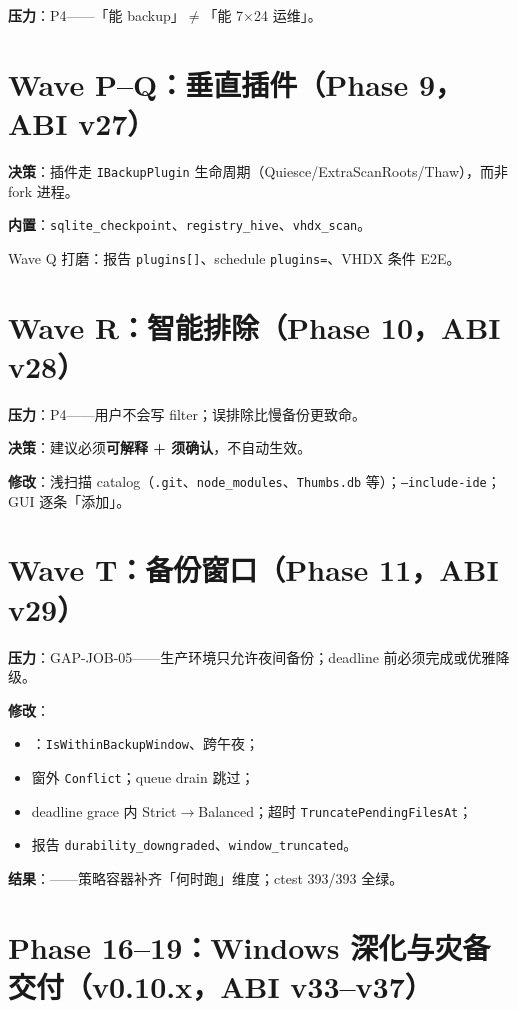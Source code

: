 \textbf{压力}：P4——「能 backup」$\neq$「能 7$\times$24 运维」。

\section{Wave P--Q：垂直插件（Phase 9，ABI v27）}

\textbf{决策}：插件走 \texttt{IBackupPlugin} 生命周期（Quiesce/ExtraScanRoots/Thaw），而非 fork 进程。

\textbf{内置}：\texttt{sqlite\_checkpoint}、\texttt{registry\_hive}、\texttt{vhdx\_scan}。

Wave Q 打磨：报告 \texttt{plugins[]}、schedule \texttt{plugins=}、VHDX 条件 E2E。

\section{Wave R：智能排除（Phase 10，ABI v28）}

\textbf{压力}：P4——用户不会写 filter；误排除比慢备份更致命。

\textbf{决策}：建议必须\textbf{可解释 + 须确认}，不自动生效。

\textbf{修改}：浅扫描 catalog（\texttt{.git}、\texttt{node\_modules}、\texttt{Thumbs.db} 等）；\texttt{--include-ide}；GUI 逐条「添加」。

\section{Wave T：备份窗口（Phase 11，ABI v29）}

\textbf{压力}：GAP-JOB-05——生产环境只允许夜间备份；deadline 前必须完成或优雅降级。

\textbf{修改}：
\begin{itemize}[nosep]
  \item {}：\texttt{IsWithinBackupWindow}、跨午夜；
  \item 窗外 \texttt{Conflict}；queue drain 跳过；
  \item deadline grace 内 Strict$\rightarrow$Balanced；超时 \texttt{TruncatePendingFilesAt}；
  \item 报告 \texttt{durability\_downgraded}、\texttt{window\_truncated}。
\end{itemize}

\textbf{结果}：——策略容器补齐「何时跑」维度；ctest 393/393 全绿。

\section{Phase 16--19：Windows 深化与灾备交付（v0.10.x，ABI v33--v37）}

